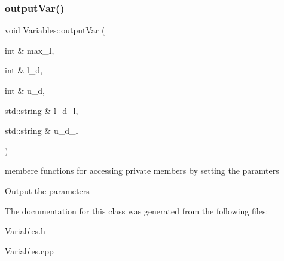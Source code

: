 \subsubsection{\texorpdfstring{output\+Var()}{outputVar()}}
{\footnotesize\ttfamily void Variables\+::output\+Var (\begin{DoxyParamCaption}\item[{int \&}]{max\+\_\+I,  }\item[{int \&}]{l\+\_\+d,  }\item[{int \&}]{u\+\_\+d,  }\item[{std\+::string \&}]{l\+\_\+d\+\_\+l,  }\item[{std\+::string \&}]{u\+\_\+d\+\_\+l }\end{DoxyParamCaption})}

membere functions for accessing private members by setting the paramters

Output the parameters 

The documentation for this class was generated from the following files\+:\begin{DoxyCompactItemize}
\item 
Variables.\+h\item 
Variables.\+cpp\end{DoxyCompactItemize}
